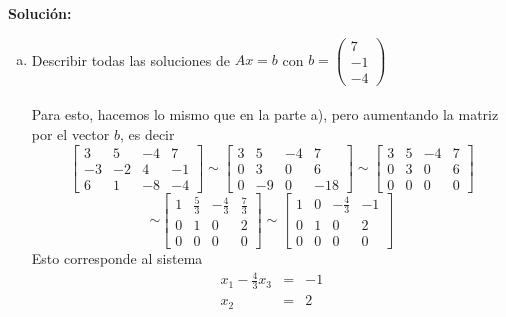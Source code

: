 \documentclass[12pt]{article}
\newenvironment{solucion}
{\begin{mdframed}[backgroundcolor=black!10]
		{\bf Solución:}\\
	}
	{
	\end{mdframed}
}
\newenvironment{preguntas}
{\begin{enumerate}\itemsep12pt
	}
	{
	\end{enumerate}
}
\begin{document}
\begin{preguntas}
\begin{solucion}
\begin{enumerate}[a)]
$$\begin{pmatrix}
			\frac{4}{3}\\
			0\\
			1
			\end{pmatrix}$$
			Luego, la solución del sistema homogeneo es
			$$S = Gen\left\{\begin{pmatrix}
			\frac{4}{3}\\
			0\\
			1
			\end{pmatrix}\right\}$$
\item Describir todas las soluciones de $Ax=b$ con $b=
			\begin{pmatrix}
			7\\
			-1\\
			-4
			\end{pmatrix}$ \\\\
			Para esto, hacemos lo mismo que en la parte a), pero aumentando la matriz por el vector $b$, es decir
			$$\left[
			\begin{array}{ccc|c}
			3 & 5 & -4 & 7\\
			-3 & -2 & 4 & -1\\
			6 & 1 & -8 & -4
			\end{array}
			\right] \sim \left[
			\begin{array}{ccc|c}
			3 & 5 & -4 & 7\\
			0 & 3 & 0 & 6\\
			0 & -9 & 0 & -18
			\end{array}
			\right] \sim \left[
			\begin{array}{ccc|c}
			3 & 5 & -4 & 7\\
			0 & 3 & 0 & 6\\
			0 & 0 & 0 & 0
			\end{array}
			\right]$$
			$$\sim \left[
			\begin{array}{ccc|c}
			1 & \frac{5}{3} & -\frac{4}{3} & \frac{7}{3}\\
			0 & 1 & 0 & 2\\
			0 & 0 & 0 & 0
			\end{array}
			\right] \sim \left[
			\begin{array}{ccc|c}
			1 & 0 & -\frac{4}{3} & -1\\
			0 & 1 & 0 & 2\\
			0 & 0 & 0 & 0
			\end{array}
			\right]$$
			Esto corresponde al sistema
			$$\begin{array}{rcl}
			x_1 - \frac{4}{3}x_3 & = & -1\\
			x_2 & = & 2\\

\end{array}$$
\end{enumerate}
\end{solucion}
\end{preguntas}
\end{document}
